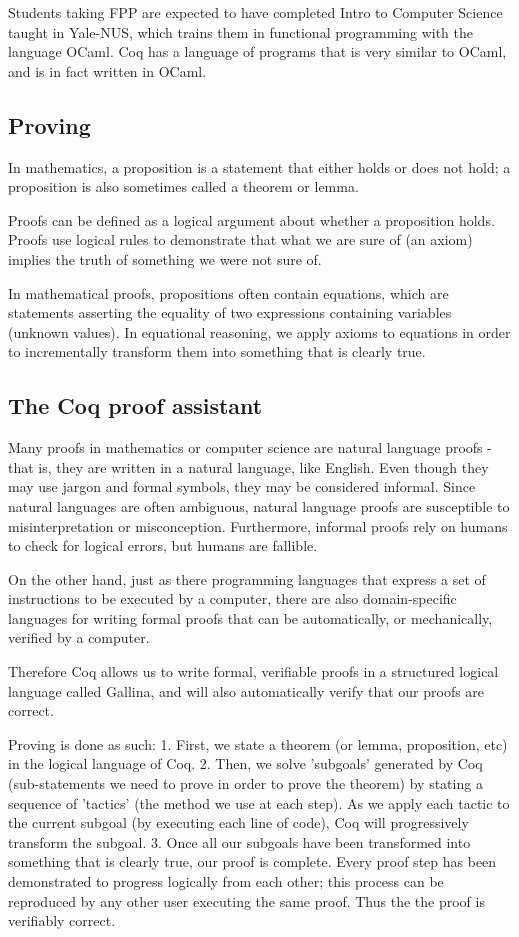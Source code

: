 Students taking FPP are expected to have completed Intro to Computer Science taught in Yale-NUS, which trains them in functional programming with the language OCaml. Coq has a language of programs that is very similar to OCaml, and is in fact written in OCaml.

\subsection{Proving}
In mathematics, a proposition is a statement that either holds or does not hold; a proposition is also sometimes called a theorem or lemma.

Proofs can be defined as a logical argument about whether a proposition holds. Proofs use logical rules to demonstrate that what we are sure of (an axiom) implies the truth of something we were not sure of.

In mathematical proofs, propositions often contain equations, which are statements asserting the equality of two expressions containing variables (unknown values). In equational reasoning, we apply axioms to equations in order to incrementally transform them into something that is clearly true.

\subsection{The Coq proof assistant}
Many proofs in mathematics or computer science are natural language proofs - that is, they are written in a natural language, like English. Even though they may use jargon and formal symbols, they may be considered informal. Since natural languages are often ambiguous, natural language proofs are susceptible to misinterpretation or misconception. Furthermore, informal proofs rely on humans to check for logical errors, but humans are fallible.

On the other hand, just as there programming languages that express a set of instructions to be executed by a computer, there are also domain-specific languages for writing formal proofs that can be automatically, or mechanically, verified by a computer.

Therefore Coq allows us to write formal, verifiable proofs in a structured logical language called Gallina, and will also automatically verify that our proofs are correct.

Proving is done as such:
1. First, we state a theorem (or lemma, proposition, etc) in the logical language of Coq.
2. Then, we solve 'subgoals'  generated by Coq (sub-statements we need to prove in order to prove the theorem) by stating a sequence of 'tactics' (the method we use at each step). As we apply each tactic to the current subgoal (by executing each line of code), Coq will progressively transform the subgoal.
3. Once all our subgoals have been transformed into something that is clearly true, our proof is complete. Every proof step has been demonstrated to progress logically from each other; this process can be reproduced by any other user executing the same proof. Thus the the proof is verifiably correct.


